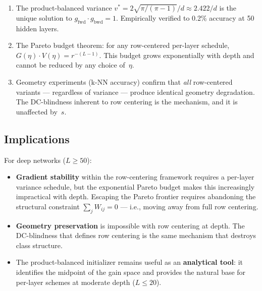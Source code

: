 \documentclass[11pt,a4paper]{article}
\theoremstyle{definition}
\begin{document}
\begin{enumerate}
  \item The product-balanced variance $v^{\ast} = 2\sqrt{\pi/(\pi-1)}/d
        \approx 2.422/d$ is the unique solution to
        $g_{\mathrm{fwd}} \cdot g_{\mathrm{bwd}} = 1$.
        Empirically verified to 0.2\% accuracy at 50 hidden layers.

  \item The Pareto budget theorem: for any row-centered per-layer
        schedule, $G(\eta) \cdot V(\eta) = r^{-(L-1)}$.  This budget
        grows exponentially with depth and cannot be reduced by any
        choice of~$\eta$.

  \item Geometry experiments (k-NN accuracy) confirm that \emph{all}
        row-centered variants --- regardless of variance --- produce
        identical geometry degradation.  The DC-blindness inherent to
        row centering is the mechanism, and it is unaffected by~$s$.
\end{enumerate}

\subsection{Implications}

For deep networks ($L \geq 50$):

\begin{itemize}
  \item \textbf{Gradient stability} within the row-centering framework
        requires a per-layer variance schedule, but the exponential
        Pareto budget makes this increasingly impractical with depth.
        Escaping the Pareto frontier requires abandoning the structural
        constraint $\sum_j W_{ij} = 0$ --- i.e., moving away from full
        row centering.

  \item \textbf{Geometry preservation} is impossible with row centering
        at depth.  The DC-blindness that defines row centering is the
        same mechanism that destroys class structure.

  \item The product-balanced initializer remains useful as an
        \textbf{analytical tool}: it identifies the midpoint of the
        gain space and provides the natural base for per-layer schemes
        at moderate depth ($L \leq 20$).
\end{itemize}
\end{document}

